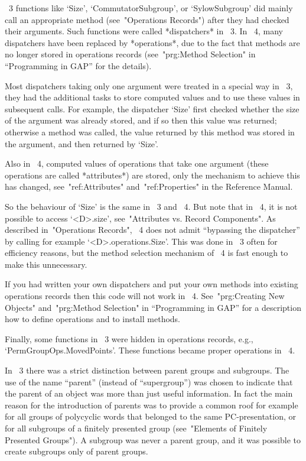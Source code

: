 {\GAP}~3 functions like `Size', `CommutatorSubgroup', or `SylowSubgroup'
did mainly call an appropriate method (see~"Operations Records")
after they had checked their arguments.
Such functions were called *dispatchers* in {\GAP}~3.
In {\GAP}~4, many dispatchers have been replaced by *operations*,
due to the fact that methods are no longer stored in operations records
(see~"prg:Method Selection" in ``Programming in GAP'' for the details).

Most dispatchers taking only one argument were treated in a special way
in {\GAP}~3, they had the additional tasks to store computed values
and to use these values in subsequent calls.
For example, the dispatcher `Size' first checked whether the size of the
argument was already stored, and if so then this value was returned;
otherwise a method was called, the value returned by this method was
stored in the argument, and then returned by `Size'.

Also in {\GAP}~4, computed values of operations that take one argument
(these operations are called *attributes*) are stored,
only the mechanism to achieve this has changed,
see~"ref:Attributes" and~"ref:Properties" in the Reference Manual.

So the behaviour of `Size' is the same in {\GAP}~3 and {\GAP}~4.
But note that in {\GAP}~4, it is not possible to access `<D>.size',
see~"Attributes vs. Record Components".
As described in~"Operations Records", {\GAP}~4 does not admit ``bypassing
the dispatcher'' by calling for example `<D>.operations.Size'.
This was done in {\GAP}~3 often for efficiency reasons,
but the method selection mechanism of {\GAP}~4 is fast enough to make
this unnecessary.

If you had written your own dispatchers and put your own methods into
existing operations records then this code will not work in {\GAP}~4.
See~"prg:Creating New Objects" and~"prg:Method Selection"
in ``Programming in GAP''
for a description how to define operations and to install methods.

Finally, some functions in {\GAP}~3 were hidden in
operations records, e.g., `PermGroupOps.MovedPoints'.
These functions became proper operations in {\GAP}~4.



In {\GAP}~3 there was a strict distinction between parent groups and
subgroups.
The use of the name ``parent'' (instead of ``supergroup'')
was chosen to indicate that the parent of an object was more than just
useful information.
In fact the main reason for the introduction of parents was to provide
a common roof for example for all groups of polycyclic words that
belonged to the same PC-presentation, or for all subgroups of a finitely
presented group (see~"Elements of Finitely Presented Groups").
A subgroup was never a parent group, and it was possible to create
subgroups only of parent groups.

